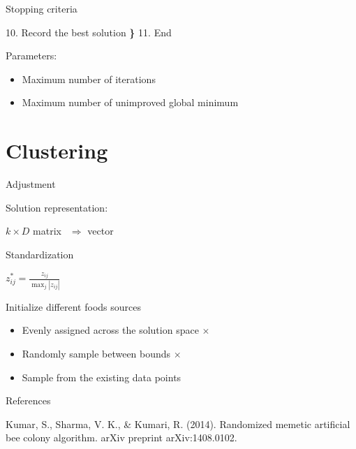 \documentclass[14pt,ignorenonframetext,compress]{beamer}
\newenvironment{Shaded}{\begin{snugshade}}{\end{snugshade}}
\newcommand{\ErrorTok}[1]{\textcolor[rgb]{0.64,0.00,0.00}{\textbf{#1}}}
\newcommand{\FloatTok}[1]{\textcolor[rgb]{0.00,0.00,0.81}{#1}}
\newcommand{\NormalTok}[1]{#1}
\providecommand{\tightlist}{%
  \setlength{\itemsep}{0pt}\setlength{\parskip}{0pt}}
\renewenvironment{Shaded}{\color{black}\begin{snugshade}\color{black}}{\end{snugshade}}
\begin{document}
\begin{frame}[fragile]{Stopping criteria}
\protect\hypertarget{stopping-criteria}{}

\begin{Shaded}
\begin{Highlighting}[]
\FloatTok{10.}\NormalTok{ Record the best solution }\ErrorTok{\}}
\FloatTok{11.}\NormalTok{ End}
\end{Highlighting}
\end{Shaded}

Parameters:

\begin{itemize}
\tightlist
\item
  Maximum number of iterations
\item
  Maximum number of unimproved global minimum
\end{itemize}

\end{frame}

\hypertarget{clustering}{%
\section{Clustering}\label{clustering}}

\begin{frame}{Adjustment}
\protect\hypertarget{adjustment}{}

\begin{block}{Solution representation:}

\(k\times D\) matrix \pause  \(\ \ \Rightarrow\) vector

\pause

\end{block}

\begin{block}{Standardization}

\(z^*_{ij} = \frac{z_{ij}}{\max_{j}|z_{ij}|}\)

\pause

\end{block}

\begin{block}{Initialize different foods sources}

\begin{itemize}
\tightlist
\item
  Evenly assigned across the solution space \(\times\)
\item
  Randomly sample between bounds \(\times\) \pause
\item
  Sample from the existing data points
\end{itemize}

\end{block}

\end{frame}

\begin{frame}[allowframebreaks]{References}
\protect\hypertarget{references}{}

Kumar, S., Sharma, V. K., \& Kumari, R. (2014). Randomized memetic
artificial bee colony algorithm. arXiv preprint arXiv:1408.0102.

\end{frame}
\end{document}
